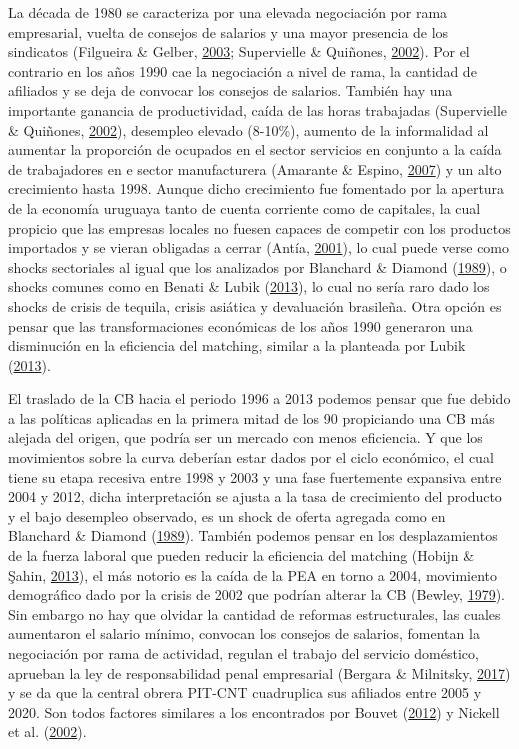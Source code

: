 \documentclass[12pt,oneside]{reedthesis}
\begin{document}
La década de 1980 se caracteriza por una elevada negociación por rama empresarial, vuelta de consejos de salarios y una mayor presencia de los sindicatos (Filgueira \& Gelber, \protect\hyperlink{ref-Filgueira2003}{2003}; Supervielle \& Quiñones, \protect\hyperlink{ref-Quinones2001}{2002}). Por el contrario en los años 1990 cae la negociación a nivel de rama, la cantidad de afiliados y se deja de convocar los consejos de salarios. También hay una importante ganancia de productividad, caída de las horas trabajadas (Supervielle \& Quiñones, \protect\hyperlink{ref-Quinones2001}{2002}), desempleo elevado (8-10\%), aumento de la informalidad al aumentar la proporción de ocupados en el sector servicios en conjunto a la caída de trabajadores en e sector manufacturera (Amarante \& Espino, \protect\hyperlink{ref-Amarante2007}{2007}) y un alto crecimiento hasta 1998. Aunque dicho crecimiento fue fomentado por la apertura de la economía uruguaya tanto de cuenta corriente como de capitales, la cual propicio que las empresas locales no fuesen capaces de competir con los productos importados y se vieran obligadas a cerrar (Antía, \protect\hyperlink{ref-Antia2001}{2001}), lo cual puede verse como shocks sectoriales al igual que los analizados por Blanchard \& Diamond (\protect\hyperlink{ref-Blanchard1989}{1989}), o shocks comunes como en Benati \& Lubik (\protect\hyperlink{ref-Benati2013}{2013}), lo cual no sería raro dado los shocks de crisis de tequila, crisis asiática y devaluación brasileña. Otra opción es pensar que las transformaciones económicas de los años 1990 generaron una disminución en la eficiencia del matching, similar a la planteada por Lubik (\protect\hyperlink{ref-Lubik2013}{2013}).

El traslado de la CB hacia el periodo 1996 a 2013 podemos pensar que fue debido a las políticas aplicadas en la primera mitad de los 90 propiciando una CB más alejada del origen, que podría ser un mercado con menos eficiencia. Y que los movimientos sobre la curva deberían estar dados por el ciclo económico, el cual tiene su etapa recesiva entre 1998 y 2003 y una fase fuertemente expansiva entre 2004 y 2012, dicha interpretación se ajusta a la tasa de crecimiento del producto y el bajo desempleo observado, es un shock de oferta agregada como en Blanchard \& Diamond (\protect\hyperlink{ref-Blanchard1989}{1989}). También podemos pensar en los desplazamientos de la fuerza laboral que pueden reducir la eficiencia del matching (Hobijn \& Şahin, \protect\hyperlink{ref-Hobijn2013}{2013}), el más notorio es la caída de la PEA en torno a 2004, movimiento demográfico dado por la crisis de 2002 que podrían alterar la CB (Bewley, \protect\hyperlink{ref-Bewley1979}{1979}). Sin embargo no hay que olvidar la cantidad de reformas estructurales, las cuales aumentaron el salario mínimo, convocan los consejos de salarios, fomentan la negociación por rama de actividad, regulan el trabajo del servicio doméstico, aprueban la ley de responsabilidad penal empresarial (Bergara \& Milnitsky, \protect\hyperlink{ref-Bergara2017}{2017}) y se da que la central obrera PIT-CNT cuadruplica sus afiliados entre 2005 y 2020. Son todos factores similares a los encontrados por Bouvet (\protect\hyperlink{ref-Bouvet2012}{2012}) y Nickell et al. (\protect\hyperlink{ref-Nickell2002}{2002}).
\end{document}
